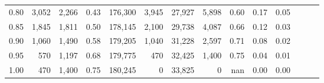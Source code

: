 \begin{tabular}{rrrrrrrrrrrrrr}
0.80 &   3,052 &  2,266 &  0.43 &  176,300 &    3,945 &  27,927 &   5,898 &  0.60 &  0.17 &      0.05 \\
0.85 &   1,845 &  1,811 &  0.50 &  178,145 &    2,100 &  29,738 &   4,087 &  0.66 &  0.12 &      0.03 \\
0.90 &   1,060 &  1,490 &  0.58 &  179,205 &    1,040 &  31,228 &   2,597 &  0.71 &  0.08 &      0.02 \\
0.95 &     570 &  1,197 &  0.68 &  179,775 &      470 &  32,425 &   1,400 &  0.75 &  0.04 &      0.01 \\
1.00 &     470 &  1,400 &  0.75 &  180,245 &        0 &  33,825 &       0 &   nan &  0.00 &      0.00 \\
\bottomrule
\end{tabular}
